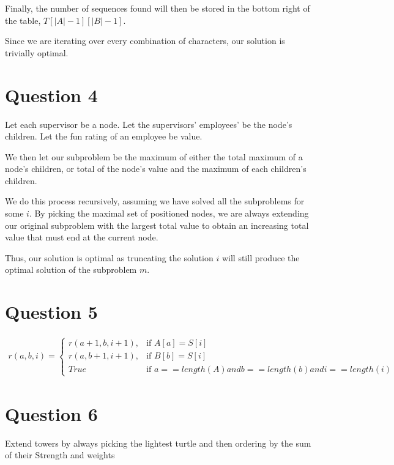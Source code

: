 \documentclass{article}
\begin{document}
Finally, the number of sequences found will then be stored in the bottom right of the table, $T[|A|-1][|B|-1]$.

Since we are iterating over every combination of characters, our solution is trivially optimal.

\section*{Question 4}
Let each supervisor be a node.
Let the supervisors' employees' be the node's children.
Let the fun rating of an employee be value.

We then let our subproblem be the maximum of either the total maximum of a node's children, or total of the node's value and the maximum of each children's children.

We do this process recursively, assuming we have solved all the subproblems for some $i$. By picking the maximal set of positioned nodes, we are always extending our original subproblem with the largest total value to obtain an increasing total value that must end at the current node.

Thus, our solution is optimal as truncating the solution $i$ will still produce the optimal solution of the subproblem $m$.

\section*{Question 5}
\begin{align*}
r(a, b, i) =
\begin{cases}
    r(a+1, b, i+1), & \text{if } A[a] = S[i]\\
    r(a, b+1, i+1), & \text{if } B[b] = S[i]\\
    True            & \text{if } a == length(A) and b == length(b) and i== length(i)
\end{cases}
\end{align*}

\section*{Question 6}
Extend towers by always picking the lightest turtle and then ordering by the sum of their Strength and weights
\end{document}
